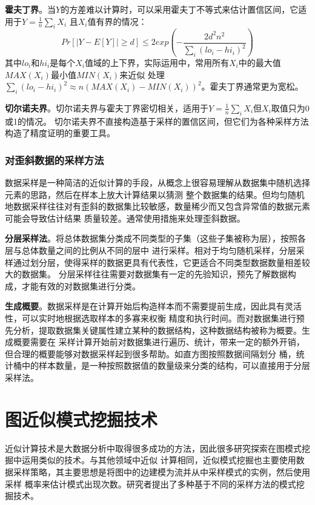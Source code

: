 \documentclass[master]{thesis-uestc}
\begin{document}
    \textbf{霍夫丁界}。当$Y$的方差难以计算时，可以采用霍夫丁不等式来估计置信区间，它适用于$Y=\frac{1}{n}\sum_iX_i$
且$X_i$值有界的情况：
\begin{equation*}
    Pr\left[\vert Y-E[Y] \vert \ge d \right] \le 2exp\left(-\frac{2d^2n^2}{\sum_i(lo_i-hi_i)^2}\right)
\end{equation*}
其中$lo_i$和$hi_i$是每个$X_i$值域的上下界，实际运用中，常用所有$X_i$中的最大值$MAX(X_i)$最小值$MIN(X_i)$来近似
处理$\sum_i(lo_i-hi_i)^2 \approx n(MAX(X_i) - MIN(X_i))^2$。霍夫丁界通常更为宽松。

    \textbf{切尔诺夫界}。切尔诺夫界与霍夫丁界密切相关，适用于$Y=\frac{1}{n}\sum_iX_i$但$X_i$取值只为0或1的情况。
切尔诺夫界不直接构造基于采样的置信区间，但它们为各种采样方法构造了精度证明的重要工具。


\subsubsection{对歪斜数据的采样方法}
\label{subsubsec:advantages-drawbacks}
    数据采样是一种简洁的近似计算的手段，从概念上很容易理解从数据集中随机选择元素的思路，然后在样本上放大计算结果以猜测
整个数据集的结果。但均匀随机地数据采样往往对有歪斜的数据集比较敏感，数量稀少而又包含异常值的数据元素可能会导致估计结果
质量较差。通常使用措施来处理歪斜数据。

    \textbf{分层采样法}。将总体数据集分类成不同类型的子集（这些子集被称为层），按照各层与总体数量之间的比例从不同的层中
进行采样。相对于均匀随机采样，分层采样通过划分层，使得采样的数据更具有代表性，它更适合不同类型数据数量相差较大的数据集。
分层采样往往需要对数据集有一定的先验知识，预先了解数据构成，才能有效的对数据集进行分类。

    \textbf{生成概要}。数据采样是在计算开始后构造样本而不需要提前生成，因此具有灵活性，可以实时地根据选取样本的多寡来权衡
精度和执行时间。而对数据集进行预先分析，提取数据集关键属性建立某种的数据结构，这种数据结构被称为概要。生成概要需要在
采样计算开始前对数据集进行遍历、统计，带来一定的额外开销，但合理的概要能够对数据采样起到很多帮助。如直方图按照数据间隔划分
桶，统计桶中的样本数量，是一种按照数据值的数量级来分类的结构，可以直接用于分层采样法。

\section{图近似模式挖掘技术}
\label{sec:graph-approximate}
    近似计算技术是大数据分析中取得很多成功的方法，因此很多研究探索在图模式挖掘中运用类似的技术。与其他领域中近似
计算相同，近似模式挖掘也主要使用数据采样策略，其主要思想是将图中的边建模为流并从中采样模式的实例，然后使用采样
概率来估计模式出现次数。研究者提出了多种基于不同的采样方法的模式挖掘技术。
\end{document}

